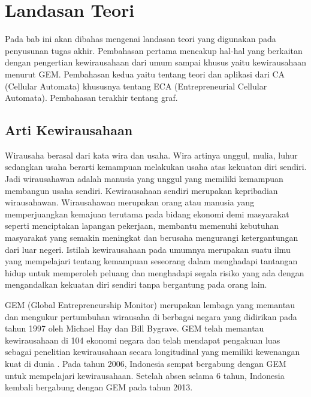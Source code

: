 \chapter{Landasan Teori}
\label{chap:teori}


 
Pada bab ini akan dibahas mengenai landasan teori yang digunakan pada penyusunan tugas akhir. Pembahasan pertama mencakup hal-hal yang berkaitan dengan pengertian kewirausahaan dari umum sampai khusus yaitu kewirausahaan menurut GEM. Pembahasan kedua yaitu tentang teori dan aplikasi dari CA (Cellular Automata) khususnya tentang ECA (Entrepreneurial Cellular Automata). Pembahasan terakhir tentang graf.


\section{Arti Kewirausahaan}
\label{sec:artiwirausaha}

\graphicspath{{images/}}

Wirausaha berasal dari kata wira dan usaha. Wira artinya unggul, mulia, luhur sedangkan usaha berarti kemampuan melakukan usaha atas kekuatan diri sendiri. Jadi wirausahawan adalah manusia yang unggul yang memiliki kemampuan membangun usaha sendiri. Kewirausahaan sendiri merupakan kepribadian wirausahawan. Wirausahawan merupakan orang atau manusia yang memperjuangkan kemajuan terutama pada bidang ekonomi demi masyarakat seperti menciptakan lapangan pekerjaan, membantu memenuhi kebutuhan masyarakat yang semakin meningkat dan berusaha mengurangi ketergantungan dari luar negeri. Istilah kewirausahaan pada umumnya merupakan suatu ilmu yang mempelajari tentang kemampuan seseorang dalam menghadapi tantangan hidup untuk memperoleh peluang dan menghadapi segala risiko yang ada dengan mengandalkan kekuatan diri sendiri tanpa bergantung pada orang lain. \cite{artiwirausaha} 


GEM (Global Entrepreneurship Monitor) merupakan lembaga yang memantau dan mengukur pertumbuhan wirausaha di berbagai negara yang didirikan pada tahun 1997 oleh Michael Hay dan Bill Bygrave. GEM telah memantau kewirausahaan di 104 ekonomi negara dan telah mendapat pengakuan luas sebagai penelitian kewirausahaan secara longitudinal yang memiliki kewenangan kuat di dunia . Pada tahun 2006, Indonesia sempat bergabung dengan GEM untuk mempelajari kewirausahaan. Setelah absen selama 6 tahun, Indonesia kembali bergabung dengan GEM pada tahun 2013.\cite{ECA}


